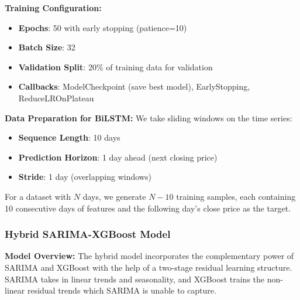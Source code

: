 \textbf{Training Configuration:}
\begin{itemize}
    \item \textbf{Epochs}: 50 with early stopping (patience=10)
    \item \textbf{Batch Size}: 32
    \item \textbf{Validation Split}: 20\% of training data for validation
    \item \textbf{Callbacks}: ModelCheckpoint (save best model), EarlyStopping, ReduceLROnPlateau
\end{itemize}

\textbf{Data Preparation for BiLSTM:}
We take sliding windows on the time series:
\begin{itemize}
    \item \textbf{Sequence Length}: 10 days
    \item \textbf{Prediction Horizon}: 1 day ahead (next closing price)
    \item \textbf{Stride}: 1 day (overlapping windows)
\end{itemize}

For a dataset with $N$ days, we generate $N - 10$ training samples, each containing 10 consecutive days of features and the following day's close price as the target.

\subsubsection{Hybrid SARIMA-XGBoost Model}

\textbf{Model Overview:}
The hybrid model incorporates the complementary power of SARIMA and XGBoost with the help of a two-stage residual learning structure. SARIMA takes in linear trends and seasonality, and XGBoost trains the non-linear residual trends which SARIMA is unable to capture.

